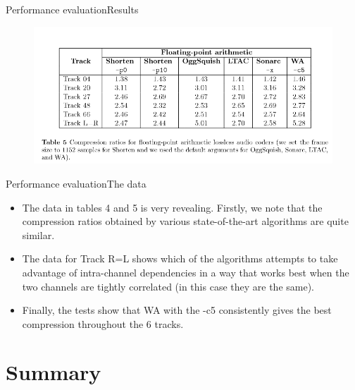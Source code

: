 \documentclass{beamer}
\begin{document}
\begin{frame}{Performance evaluation}{Results}
	\begin{figure}
		\includegraphics[scale=0.35]{results3.png}
	\end{figure} 
\end{frame}

\begin{frame}{Performance evaluation}{The data}
	\begin{itemize}
		\item{
			The data in tables 4 and 5 is very revealing. Firstly, we note that the compression ratios obtained by various state-of-the-art algorithms are quite similar.
		}
		\item{
			The data for Track R=L shows which of the algorithms attempts to take advantage of intra-channel dependencies in a way that works best when the two channels are tightly correlated (in this case they are the same).
		}
		\item{
			Finally, the tests show that WA with the -c5 consistently gives the best compression throughout the 6 tracks.
		}
	\end{itemize}
\end{frame}

\section*{Summary}
\end{document}
